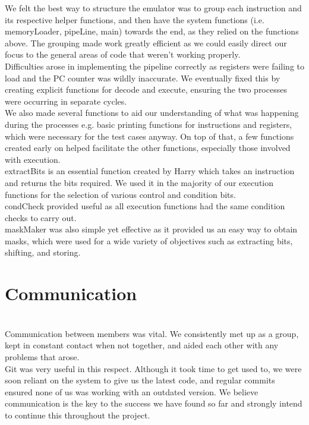 \documentclass{article}
\begin{document}
We felt the best way to structure the emulator was to group each instruction and its respective helper functions, and then have the system functions (i.e. memoryLoader, pipeLine, main) towards the end, as they relied on the functions above. The grouping made work greatly efficient as we could easily direct our focus to the general areas of code that weren't working properly. \\
Difficulties arose in implementing the pipeline correctly as registers were failing to load and the PC counter was wildly inaccurate. We eventually fixed this by creating explicit functions for decode and execute, ensuring the two processes were occurring in separate cycles.\\
We also made several functions to aid our understanding of what was happening during the processes e.g. basic printing functions for instructions and registers, which were necessary for the test cases anyway. On top of that, a few functions created early on helped facilitate the other functions, especially those involved with execution.\\
extractBits is an essential function created by Harry which takes an instruction and returns the bits required. We used it in the majority of our execution functions for the selection of various control and condition bits.\\
condCheck provided useful as all execution functions had the same condition checks to carry out.\\
maskMaker was also simple yet effective as it provided us an easy way to obtain masks, which were used for a wide variety of objectives such as extracting bits, shifting, and storing.
\\



\section{Communication}
\\

Communication between members was vital. We consistently met up as a group, kept in constant contact when not together, and aided each other with any problems that arose.\\
Git was very useful in this respect. Although it took time to get used to, we were soon reliant on the system to give us the latest code, and regular commits ensured none of us was working with an outdated version. We believe communication is the key to the success we have found so far and strongly intend to continue this throughout the project.
\\
\end{document}
